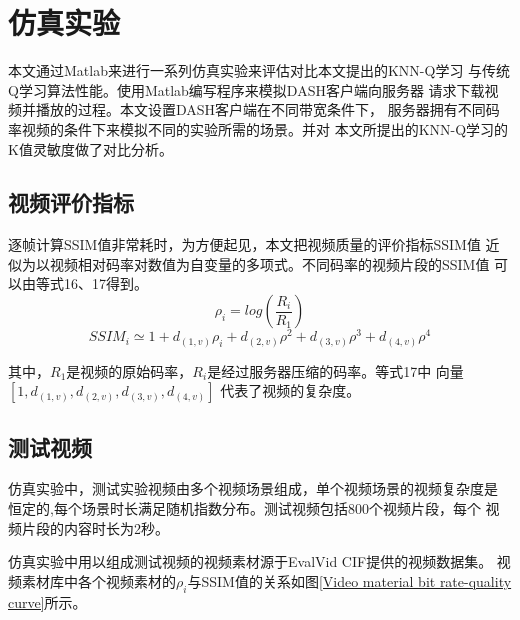 \documentclass[twocolumn]{article}
\begin{document}
\section{仿真实验}
本文通过Matlab来进行一系列仿真实验来评估对比本文提出的KNN-Q学习
与传统Q学习算法性能。使用Matlab编写程序来模拟DASH客户端向服务器
请求下载视频并播放的过程。本文设置DASH客户端在不同带宽条件下，
服务器拥有不同码率视频的条件下来模拟不同的实验所需的场景。并对
本文所提出的KNN-Q学习的K值灵敏度做了对比分析。
\subsection{视频评价指标}
逐帧计算SSIM值非常耗时，为方便起见，本文把视频质量的评价指标SSIM值
近似为以视频相对码率对数值为自变量的多项式\cite{RN19}。不同码率的视频片段的SSIM值
可以由等式16、17得到。
\begin{equation}
\rho_{i}=log\left(\frac{R_{i}}{R_{1}}\right)
\end{equation}
\begin{equation}
SSIM_{i}\simeq1+d_{(1,v)}\rho_{i}+d_{(2,v)}\rho^2+d_{(3,v)}\rho^3+d_{(4,v)}\rho^4
\end{equation}

其中，$R_{1}$是视频的原始码率，$R_{i}$是经过服务器压缩的码率。等式17中
向量$\left[1,d_{(1,v)},d_{(2,v)},d_{(3,v)},d_{(4,v)}\right]$
代表了视频的复杂度。
\subsection{测试视频}
仿真实验中，测试实验视频由多个视频场景组成，单个视频场景的视频复杂度是
恒定的,每个场景时长满足随机指数分布。测试视频包括800个视频片段，每个
视频片段的内容时长为2秒。

仿真实验中用以组成测试视频的视频素材源于EvalVid CIF提供的视频数据集\cite{RN20}。
视频素材库中各个视频素材的$\rho_{i}$与SSIM值的关系如图\ref{Video material bit rate-quality curve}所示。
\end{document}
